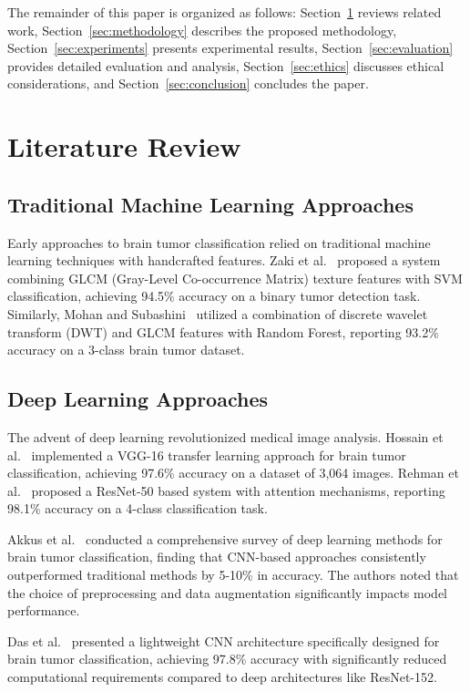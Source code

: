 \documentclass[conference]{IEEEtran}
\begin{document}
The remainder of this paper is organized as follows: Section~\ref{sec:related} reviews related work, Section~\ref{sec:methodology} describes the proposed methodology, Section~\ref{sec:experiments} presents experimental results, Section~\ref{sec:evaluation} provides detailed evaluation and analysis, Section~\ref{sec:ethics} discusses ethical considerations, and Section~\ref{sec:conclusion} concludes the paper.


\section{Literature Review}
\label{sec:related}

\subsection{Traditional Machine Learning Approaches}
Early approaches to brain tumor classification relied on traditional machine learning techniques with handcrafted features. Zaki et al.~\cite{zaki2019} proposed a system combining GLCM (Gray-Level Co-occurrence Matrix) texture features with SVM classification, achieving 94.5\% accuracy on a binary tumor detection task. Similarly, Mohan and Subashini~\cite{mohan2018} utilized a combination of discrete wavelet transform (DWT) and GLCM features with Random Forest, reporting 93.2\% accuracy on a 3-class brain tumor dataset.

\subsection{Deep Learning Approaches}
The advent of deep learning revolutionized medical image analysis. Hossain et al.~\cite{hossain2021} implemented a VGG-16 transfer learning approach for brain tumor classification, achieving 97.6\% accuracy on a dataset of 3,064 images. Rehman et al.~\cite{rehman2022} proposed a ResNet-50 based system with attention mechanisms, reporting 98.1\% accuracy on a 4-class classification task.

Akkus et al.~\cite{akkus2017} conducted a comprehensive survey of deep learning methods for brain tumor classification, finding that CNN-based approaches consistently outperformed traditional methods by 5-10\% in accuracy. The authors noted that the choice of preprocessing and data augmentation significantly impacts model performance.

Das et al.~\cite{das2022} presented a lightweight CNN architecture specifically designed for brain tumor classification, achieving 97.8\% accuracy with significantly reduced computational requirements compared to deep architectures like ResNet-152.
\end{document}
